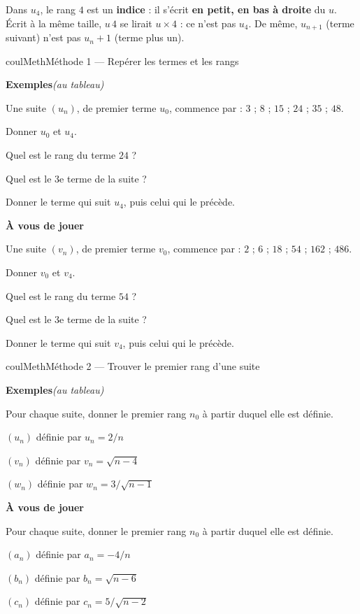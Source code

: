 \documentclass[11pt,a4paper]{article}
\makeatletter
\newcounter{lycee@signet}
\newcommand{\signet}[3][]{\stepcounter{lycee@signet}%
  \edef\lycee@dest{\if\relax\detokenize{#1}\relax
    signet.\arabic{lycee@signet}\else#1\fi}%
  \hypertarget{\lycee@dest}{}\bookmark[level=#2,dest=\lycee@dest]{#3}}
\def\textsuperscript#1{#1}\def\dfrac#1#2{#1/#2}\def\frac#1#2{#1/#2}%
\newcounter{methode}
\newenvironment{methodebox}[1][Méthode]{\stepcounter{methode}%
  \begin{boitecours}[phantom={\signet[methode-\arabic{methode}]{2}{#1}}]{coulMeth}{#1}}%
  {\end{boitecours}}
\newcommand{\etape}[1]{\par\smallskip\textbf{\color{coulMeth}#1}\par\nobreak\smallskip}
\newcommand{\autableau}{\hfill{\footnotesize\itshape\color{black!45}(au tableau)}}
\newcommand{\etapeexemples}{%
    \par\smallskip\textbf{\color{coulMeth}Exemples}\autableau\par\nobreak\smallskip}
\makeatother
\begin{document}
\begin{remarquebox}
Dans $u_{4}$, le rang $4$ est un \textbf{indice} : il s'écrit \textbf{en petit, en bas à
droite} du $u$. Écrit à la même taille, \og $u\,4$\fg{} se lirait $u\times 4$ : ce n'est
pas $u_{4}$. De même, $u_{n+1}$ (terme suivant) n'est pas $u_{n}+1$ (terme plus un).
\end{remarquebox}

\begin{methodebox}[Méthode 1 --- Repérer les termes et les rangs]
\etapeexemples
Une suite $(u_{n})$, de premier terme $u_{0}$, commence par :
\quad $3$ ;\; $8$ ;\; $15$ ;\; $24$ ;\; $35$ ;\; $48$.
\begin{questions}[label=\alph*)]
  \item Donner $u_{0}$ et $u_{4}$.
  \item Quel est le rang du terme $24$ ?
  \item Quel est le 3\textsuperscript{e} terme de la suite ?
  \item Donner le terme qui suit $u_{4}$, puis celui qui le précède.
\end{questions}

\etape{À vous de jouer}
Une suite $(v_{n})$, de premier terme $v_{0}$, commence par :
\quad $2$ ;\; $6$ ;\; $18$ ;\; $54$ ;\; $162$ ;\; $486$.
\begin{questions}[label=\alph*)]
  \item Donner $v_{0}$ et $v_{4}$.
  \item Quel est le rang du terme $54$ ?
  \item Quel est le 3\textsuperscript{e} terme de la suite ?
  \item Donner le terme qui suit $v_{4}$, puis celui qui le précède.
\end{questions}

\end{methodebox}

\begin{methodebox}[Méthode 2 --- Trouver le premier rang d'une suite]
\etapeexemples
Pour chaque suite, donner le premier rang $n_{0}$ à partir duquel elle est définie.
\begin{questions}[label=\alph*)]
  \item $(u_{n})$ définie par $u_{n}=\dfrac{2}{n}$
  \item $(v_{n})$ définie par $v_{n}=\sqrt{n-4}$
  \item $(w_{n})$ définie par $w_{n}=\dfrac{3}{\sqrt{n-1}}$
\end{questions}

\etape{À vous de jouer}
Pour chaque suite, donner le premier rang $n_{0}$ à partir duquel elle est définie.
\begin{questions}[label=\alph*)]
  \item $(a_{n})$ définie par $a_{n}=-\dfrac{4}{n}$
  \item $(b_{n})$ définie par $b_{n}=\sqrt{n-6}$
  \item $(c_{n})$ définie par $c_{n}=\dfrac{5}{\sqrt{n-2}}$
\end{questions}

\end{methodebox}
\end{document}
